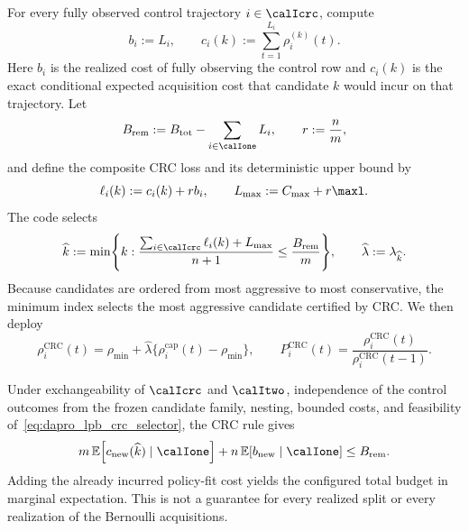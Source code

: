 For every fully observed control trajectory $i\in\calIcrc$, compute
\begin{equation}
    b_i:=L_i,
    \qquad
    c_i(k):=\sum_{t=1}^{L_i}\rho_i^{(k)}(t).
    \label{eq:dapro_lpb_crc_costs}
\end{equation}
Here $b_i$ is the realized cost of fully observing the control row and
$c_i(k)$ is the exact conditional expected acquisition cost that candidate
$k$ would incur on that trajectory.  Let
\begin{equation}
    B_{\mathrm{rem}}
    :=B_{\mathrm{tot}}-\sum_{i\in\calIone}L_i,
    \qquad r:=\frac{n}{m},
\end{equation}
and define the composite CRC loss and its deterministic upper bound by
\begin{equation}
    \ell_i(k):=c_i(k)+r b_i,
    \qquad
    L_{\max}:=C_{\max}+r\maxl.
    \label{eq:dapro_lpb_crc_loss}
\end{equation}
The code selects
\begin{equation}
\begin{split}
    \widehat k
    :=\min\Biggl\{k:
      \frac{
        \sum_{i\in\calIcrc}\ell_i(k)+L_{\max}
      }{n+1}
      \leq\frac{B_{\mathrm{rem}}}{m}
    \Biggr\},
    \qquad
    \widehat\lambda:=\lambda_{\widehat k}.
    \label{eq:dapro_lpb_crc_selector}
\end{split}
\end{equation}
Because candidates are ordered from most aggressive to most conservative,
the minimum index selects the most aggressive candidate certified by CRC.  We
then deploy
\begin{equation}
    \rho_i^{\mathrm{CRC}}(t)
      =\rho_{\min}
       +\widehat\lambda
        \{\rho_i^{\mathrm{cap}}(t)-\rho_{\min}\},
    \qquad
    P_i^{\mathrm{CRC}}(t)
      =\frac{\rho_i^{\mathrm{CRC}}(t)}
             {\rho_i^{\mathrm{CRC}}(t-1)}.
    \label{eq:dapro_lpb_crc_deployed}
\end{equation}

Under exchangeability of $\calIcrc$ and $\calItwo$, independence of the
control outcomes from the frozen candidate family, nesting, bounded costs,
and feasibility of~\eqref{eq:dapro_lpb_crc_selector}, the CRC rule gives
\begin{equation}
    m\,\mathbb E\!\left[c_{\mathrm{new}}(\widehat k)
       \mid\calIone\right]
    +n\,\mathbb E\!\left[b_{\mathrm{new}}\mid\calIone\right]
    \leq B_{\mathrm{rem}}.
    \label{eq:dapro_lpb_crc_guarantee}
\end{equation}
Adding the already incurred policy-fit cost yields the configured total budget
in marginal expectation.  This is not a guarantee for every realized split
or every realization of the Bernoulli acquisitions.

